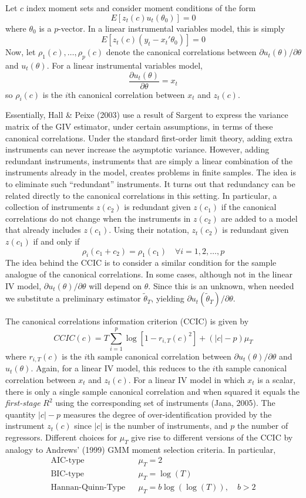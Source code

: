 \documentclass[12pt]{article}
\theoremstyle{definition}
\begin{document}
Let $c$ index moment sets and consider moment conditions of the form 
  $$E[z_t(c)u_t(\theta_0)]=0$$
where $\theta_0$ is a $p$-vector. In a linear instrumental variables model, this is simply
  $$E[z_t(c) (y_t - x_t'\theta_0)] = 0$$
Now, let $\rho_1(c), \hdots, \rho_p(c)$ denote the canonical correlations between $\partial u_t(\theta)/\partial \theta$ and $u_t(\theta)$. For a linear instrumental variables model, 
  $$\frac{\partial u_t(\theta)}{\partial \theta} = x_t$$
so $\rho_i(c)$ is the $i$th canonical correlation between $x_t$ and $z_t(c)$. 

Essentially, Hall \& Peixe (2003) use a result of Sargent to express the variance matrix of the GIV estimator, under certain assumptions, in terms of these canonical correlations. Under the standard first-order limit theory, adding extra instruments can never increase the asymptotic variance. However, adding redundant instruments, instruments that are simply a linear combination of the instruments already in the model, creates problems in finite samples. The idea is to eliminate such ``redundant'' instruments. It turns out that redundancy can be related directly to the canonical correlations in this setting. In particular, a collection of instruments $z(c_2)$ is redundant given $z(c_1)$ if the canonical correlations do not change when the instruments in $z(c_2)$ are added to a model that already includes $z(c_1)$. Using their notation, $z_t(c_2)$ is redundant given $z(c_1)$ if and only if
  $$\rho_i(c_1 + c_2) = \rho_1(c_1) \quad \forall i = 1,2, \hdots, p$$
The idea behind the CCIC is to consider a similar condition for the sample analogue of the canonical correlations. In some cases, although not in the linear IV model, $\partial u_t(\theta)/\partial \theta$ will depend on $\theta$. Since this is an unknown, when needed we substitute a preliminary estimator $\widetilde{\theta}_T$, yielding $\partial u_t(\widetilde{\theta}_T)/\partial \theta$.

The canonical correlations information criterion (CCIC) is given by
  $$CCIC(c) = T\sum_{i=1}^p \log\left[1 - r_{i,T}(c)^2 \right] + (|c| - p)\mu_T$$
where $r_{i,T}(c)$ is the $i$th sample canonical correlation between $\partial u_t(\theta)/\partial \theta$ and $u_t(\theta)$. Again, for a linear IV model, this reduces to the $i$th sample canonical correlation between $x_t$ and $z_t(c)$. For a linear IV model in which $x_t$ is a scalar, there is only a single sample canonical correlation and when squared it equals the \emph{first-stage} $R^2$ using the corresponding set of instruments (Jana, 2005). The quantity $|c| - p$ measures the degree of over-identification provided by the instrument $z_t(c)$ since $|c|$ is the number of instruments, and $p$ the number of regressors. Different choices for $\mu_T$ give rise to different versions of the CCIC by analogy to Andrews' (1999) GMM moment selection criteria. In particular, 
  \begin{eqnarray*}
    \mbox{AIC-type} && \mu_T = 2\\
    \mbox{BIC-type} && \mu_T = \log(T)\\
    \mbox{Hannan-Quinn-Type} && \mu_T = b \log(\log(T)), \quad b > 2
  \end{eqnarray*}
\end{document}
